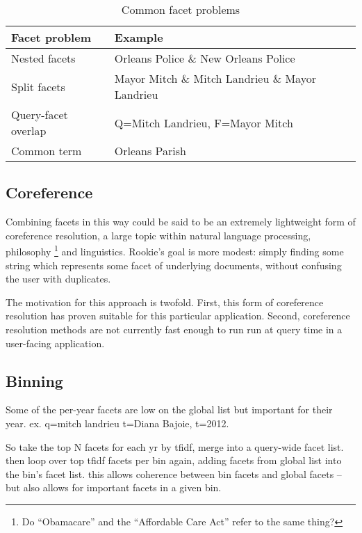 \documentclass{article}
\begin{document}
\begin{table}[h!]
\begin{center}
\begin{tabular}{ l l }
 Facet problem & Example \\ 
 \hline
 Nested facets & Orleans Police \& New Orleans Police  \\ 
 Split facets & Mayor Mitch \& Mitch Landrieu \& Mayor Landrieu \\  
 Query-facet overlap & Q=Mitch Landrieu, F=Mayor Mitch \\
 Common term & Orleans Parish

\end{tabular}
\caption{Common facet problems}
\end{center}
\label{t2:two}
\end{table}

\subsection{Coreference}

Combining facets in this way could be said to be an extremely lightweight form of coreference resolution, a large topic within natural language processing, philosophy \footnote{Do ``Obamacare'' and the ``Affordable Care Act'' refer to the same thing?} and linguistics. Rookie's goal is more modest: simply finding some string which represents some facet of underlying documents, without confusing the user with duplicates. 

The motivation for this approach is twofold. First, this form of coreference resolution has proven suitable for this particular application. Second, coreference resolution methods are not currently fast enough to run run at query time in a user-facing application.

\subsection{Binning}

Some of the per-year facets are low on the global list but important for their year. ex. q=mitch landrieu t=Diana Bajoie, t=2012.

So take the top N facets for each yr by tfidf, merge into a query-wide facet list. then loop over top tfidf facets per bin again, adding facets from global list into the bin's facet list. this allows coherence between bin facets and global facets -- but also allows for important facets in a given bin.
\end{document}
